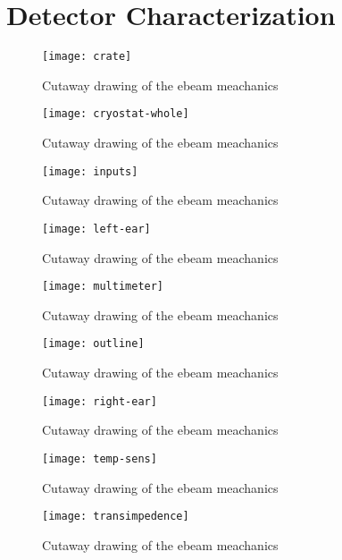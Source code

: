 \chapter{Detector Characterization}

\begin{figure}[htpb]
\centering
\texttt{[image: crate]}
\caption{Cutaway drawing of the ebeam meachanics}
\label{fig:crate}
\end{figure}

\begin{figure}[htpb]
\centering
\texttt{[image: cryostat-whole]}
\caption{Cutaway drawing of the ebeam meachanics}
\label{fig:cryostat-whole}
\end{figure}

\begin{figure}[htpb]
\centering
\texttt{[image: inputs]}
\caption{Cutaway drawing of the ebeam meachanics}
\label{fig:inputs}
\end{figure}

\begin{figure}[htpb]
\centering
\texttt{[image: left-ear]}
\caption{Cutaway drawing of the ebeam meachanics}
\label{fig:left-ear}
\end{figure}

\begin{figure}[htpb]
\centering
\texttt{[image: multimeter]}
\caption{Cutaway drawing of the ebeam meachanics}
\label{fig:multimeter}
\end{figure}

\begin{figure}[htpb]
\centering
\texttt{[image: outline]}
\caption{Cutaway drawing of the ebeam meachanics}
\label{fig:outline}
\end{figure}

\begin{figure}[htpb]
\centering
\texttt{[image: right-ear]}
\caption{Cutaway drawing of the ebeam meachanics}
\label{fig:right-ear}
\end{figure}

\begin{figure}[htpb]
\centering
\texttt{[image: temp-sens]}
\caption{Cutaway drawing of the ebeam meachanics}
\label{fig:temp-sens}
\end{figure}

\begin{figure}[htpb]
\centering
\texttt{[image: transimpedence]}
\caption{Cutaway drawing of the ebeam meachanics}
\label{fig:transimpedence}
\end{figure}